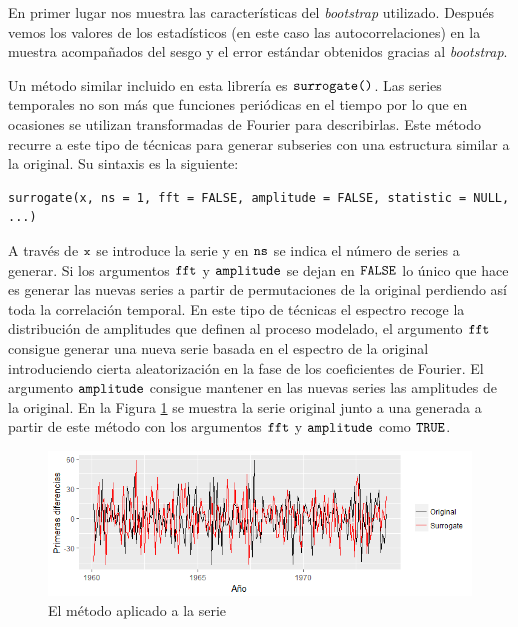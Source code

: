 En primer lugar nos muestra las características del \textit{bootstrap} utilizado. Después vemos los valores de los estadísticos (en este caso las autocorrelaciones) en la muestra acompañados del sesgo y el error estándar obtenidos gracias al \textit{bootstrap}.

Un método similar incluido en esta librería es $\verb!surrogate()!$. Las series temporales no son más que funciones periódicas en el tiempo por lo que en ocasiones se utilizan transformadas de Fourier para describirlas. Este método recurre a este tipo de técnicas para generar subseries con una estructura similar a la original. Su sintaxis es la siguiente:
\begin{Verbatim}[fontsize=\footnotesize]
surrogate(x, ns = 1, fft = FALSE, amplitude = FALSE, statistic = NULL, ...)
\end{Verbatim}

A través de $\verb!x!$ se introduce la serie y en $\verb!ns!$ se indica el número de series a generar. Si los argumentos $\verb!fft!$ y $\verb!amplitude!$ se dejan en $\verb!FALSE!$ lo único que hace es generar las nuevas series a partir de permutaciones de la original perdiendo así toda la correlación temporal. En este tipo de técnicas el espectro recoge la distribución de amplitudes que definen al proceso modelado, el argumento $\verb!fft!$ consigue generar una nueva serie basada en el espectro de la original introduciendo cierta aleatorización en la fase de los coeficientes de Fourier. El argumento $\verb!amplitude!$ consigue mantener en las nuevas series las amplitudes de la original. En la Figura \ref{surrogate} se muestra la serie original junto a una generada a partir de este método con los argumentos $\verb!fft!$ y $\verb!amplitude!$ como $\verb!TRUE!$.
\begin{figure}
    \centering
    \centerline{\includegraphics[scale = 0.7]{Images/Modelizacion/325.png}}
    \caption{El método  aplicado a la serie }
    \label{surrogate}
\end{figure}

